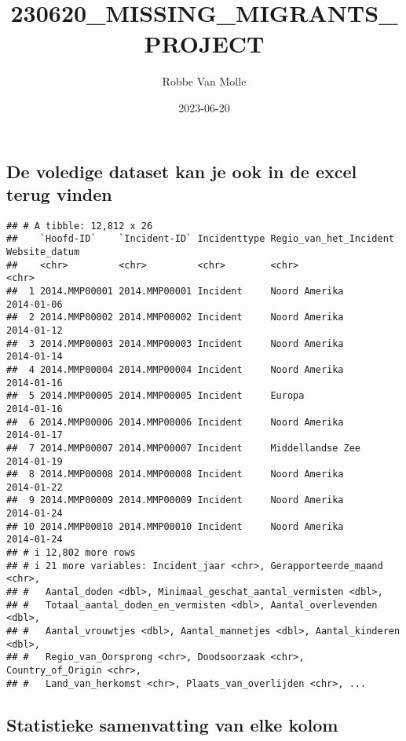 \documentclass[
]{article}
\title{230620\_MISSING\_MIGRANTS\_PROJECT}
\author{Robbe Van Molle}
\date{2023-06-20}
\begin{document}
\maketitle

\hypertarget{de-voledige-dataset-kan-je-ook-in-de-excel-terug-vinden}{%
\subsection{De voledige dataset kan je ook in de excel terug
vinden}\label{de-voledige-dataset-kan-je-ook-in-de-excel-terug-vinden}}

\begin{verbatim}
## # A tibble: 12,812 x 26
##    `Hoofd-ID`    `Incident-ID` Incidenttype Regio_van_het_Incident Website_datum
##    <chr>         <chr>         <chr>        <chr>                  <chr>        
##  1 2014.MMP00001 2014.MMP00001 Incident     Noord Amerika          2014-01-06   
##  2 2014.MMP00002 2014.MMP00002 Incident     Noord Amerika          2014-01-12   
##  3 2014.MMP00003 2014.MMP00003 Incident     Noord Amerika          2014-01-14   
##  4 2014.MMP00004 2014.MMP00004 Incident     Noord Amerika          2014-01-16   
##  5 2014.MMP00005 2014.MMP00005 Incident     Europa                 2014-01-16   
##  6 2014.MMP00006 2014.MMP00006 Incident     Noord Amerika          2014-01-17   
##  7 2014.MMP00007 2014.MMP00007 Incident     Middellandse Zee       2014-01-19   
##  8 2014.MMP00008 2014.MMP00008 Incident     Noord Amerika          2014-01-22   
##  9 2014.MMP00009 2014.MMP00009 Incident     Noord Amerika          2014-01-24   
## 10 2014.MMP00010 2014.MMP00010 Incident     Noord Amerika          2014-01-24   
## # i 12,802 more rows
## # i 21 more variables: Incident_jaar <chr>, Gerapporteerde_maand <chr>,
## #   Aantal_doden <dbl>, Minimaal_geschat_aantal_vermisten <dbl>,
## #   Totaal_aantal_doden_en_vermisten <dbl>, Aantal_overlevenden <dbl>,
## #   Aantal_vrouwtjes <dbl>, Aantal_mannetjes <dbl>, Aantal_kinderen <dbl>,
## #   Regio_van_Oorsprong <chr>, Doodsoorzaak <chr>, Country_of_Origin <chr>,
## #   Land_van_herkomst <chr>, Plaats_van_overlijden <chr>, ...
\end{verbatim}

\hypertarget{statistieke-samenvatting-van-elke-kolom}{%
\subsection{Statistieke samenvatting van elke
kolom}\label{statistieke-samenvatting-van-elke-kolom}}
\end{document}
